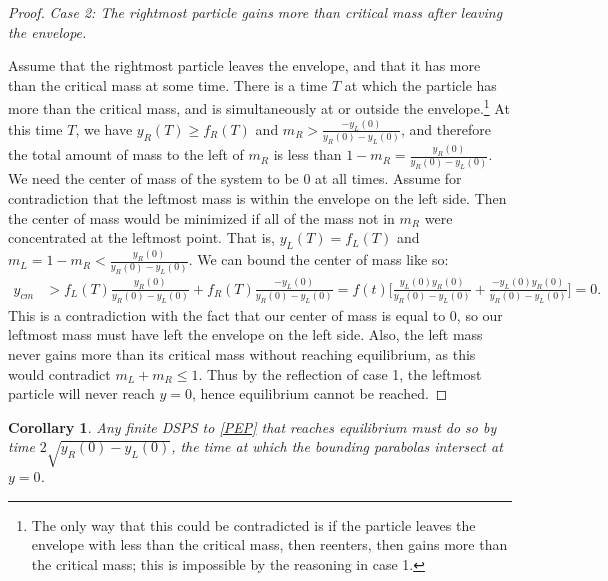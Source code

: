 \documentclass[11pt]{article}
\newtheorem{corollary}[theorem]{Corollary}
\numberwithin{equation}{section}
\begin{document}
\begin{proof}
            
            
            {\textit{Case 2:  The rightmost particle gains more than critical mass after leaving  the envelope.}}
            
            Assume that the rightmost particle leaves the envelope, and that it has more than the critical mass at some time. There is a time $T$ at which the particle has more than the critical mass, and is simultaneously at or outside the envelope.\footnote{The only way that this could be contradicted is if the particle leaves the envelope with less than the critical mass, then reenters, then gains more than the critical mass; this is impossible by the reasoning in case 1.} At this time $T$, we have $y_R(T)\ge f_R(T)$ and $m_R>\frac{-y_L(0)}{y_R(0)-y_L(0)}$, and therefore the total amount of mass to the left of $m_R$ is less than $1-m_R=\frac{y_R(0)}{y_R(0)-y_L(0)}$. We need the center of mass of the system to be $0$ at all times. Assume for contradiction that the leftmost mass is within the envelope on the left side. Then the center of mass would be minimized if all of the mass not in $m_R$ were concentrated at the leftmost point. That is, $y_L(T)=f_L(T)$ and $m_L=1-m_R< \frac{y_R(0)}{y_R(0)-y_L(0)}$. We can bound the center of mass like so: 
            \begin{align*}
                y_{cm}&> f_L(T)\frac{y_R(0)}{y_R(0)-y_L(0)} + f_R(T)\frac{-y_L(0)}{y_R(0)-y_L(0)}=f(t)\bigg[\frac{y_L(0)y_R(0)}{y_R(0)-y_L(0)} + \frac{-y_L(0)y_R(0)}{y_R(0)-y_L(0)}\bigg]=0.
            \end{align*}
            This is a contradiction with the fact that our center of mass is equal to 0, so our leftmost mass must have left the envelope on the left side. Also, the left mass never gains more than its critical mass without reaching equilibrium, as this would contradict $m_L+m_R \le 1$. Thus by the reflection of case 1, the leftmost particle will never reach $y=0$, hence equilibrium cannot be reached.
        \end{proof}
    
        \begin{corollary}\label{time-bound-corollary}
            Any finite DSPS to \eqref{PEP} that reaches equilibrium must do so by time $2\sqrt{y_R(0)-y_L(0)}$, the time at which the bounding parabolas intersect at $y=0$.
        \end{corollary}
        
\end{document}
